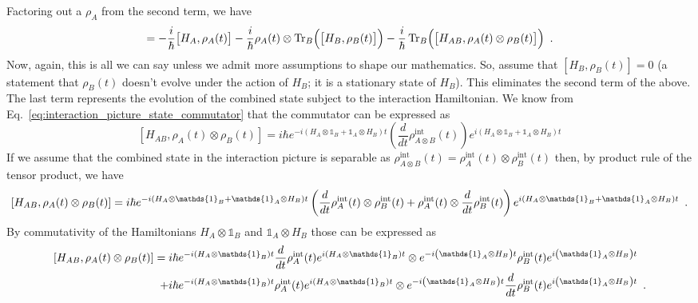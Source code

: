 \documentclass{article}
\begin{document}
Factoring out a $ \rho_{A} $ from the second term, we have
\begin{equation}
= -\frac{i}{\hbar} \bigl[  H_{A} , \rho_{A}(t) \bigr]
-\frac{i}{\hbar} \rho_{A}(t) \otimes \operatorname{Tr}_{B} \Bigl( \bigl[ H_{B} , \rho_{B}(t)
      \label{eq:evolution_of_density_matrix_in_interaction_picture_intermediate_form}
\bigr] \Bigr)
- \frac{i}{\hbar} \operatorname{Tr}_{B} \Bigl( \bigl[ H_{AB} ,  \rho_{A}(t) \otimes \rho_{B}(t) \bigr] \Bigr) \enskip.
\end{equation}
Now, again, this is all we can say unless we admit more assumptions to shape our
mathematics. So, assume that $ \left[H_{B}, \rho_{B}(t)\right] = 0 $ (a
statement that $ \rho_{B}(t) $ doesn't evolve under the action of $ H_{B} $;
it is a stationary state of $ H_{B} $). This eliminates the second term of
the above. The last term represents the evolution of the combined state
subject to the interaction Hamiltonian. We know from
Eq.~\ref{eq:interaction_picture_state_commutator} that the commutator can be
expressed as
\begin{equation}
   \left[ H_{AB}, \rho_{A}(t) \otimes \rho_{B}(t) \right] = i \hbar e^{- i (H_{A} \otimes \mathds{1}_{B} + \mathds{1}_{A}
      \otimes H_{B}) t } \left(\frac{d}{dt} \rho^{\textrm{int}}_{A \otimes B}(t) \right) e^{i (H_{A} \otimes \mathds{1}_{B} + \mathds{1}_{A}
   \otimes H_{B}) t }
\end{equation}
If we assume that the combined state in the interaction picture is separable as
$ \rho_{A \otimes B}^{\textrm{int}}(t) =
\rho_{A}^{\textrm{int}}(t) \otimes \rho_{B}^{\textrm{int}}(t) $ then, by product
rule of the tensor product, we have
\begin{equation}
   \left[ H_{AB}, \rho_{A}(t) \otimes \rho_{B}(t) \right] = i \hbar e^{- i (H_{A} \otimes \mathds{1}_{B} + \mathds{1}_{A}
      \otimes H_{B}) t } \left(\frac{d}{dt} \rho^{\textrm{int}}_{A}(t) \otimes
      \rho_{B}^{\textrm{int}}(t) + \rho^{\textrm{int}}_{A}(t) \otimes \frac{d}{dt}
      \rho_{B}^{\textrm{int}}(t) \right) e^{i (H_{A} \otimes \mathds{1}_{B} + \mathds{1}_{A}
   \otimes H_{B}) t } \enskip.
\end{equation}
By commutativity of the Hamiltonians $ H_{A} \otimes \mathds{1}_{B} $ and $ \mathds{1}_{A}
   \otimes H_{B} $ those can be expressed as
\begin{align*}
   \left[ H_{AB}, \rho_{A}(t) \otimes \rho_{B}(t) \right] = i \hbar
   & e^{- i (H_{A} \otimes \mathds{1}_{B}) t }
   \frac{d}{dt} \rho^{\textrm{int}}_{A}(t)
   e^{i (H_{A} \otimes \mathds{1}_{B}) t }
   \otimes
   e^{-i \left( \mathds{1}_{A} \otimes H_{B} \right) t }
      \rho_{B}^{\textrm{int}}(t)
      e^{i \left( \mathds{1}_{A} \otimes H_{B} \right) t }
      \\
      + i \hbar & e^{- i (H_{A} \otimes \mathds{1}_{B}) t }
      \rho^{\textrm{int}}_{A}(t)
      e^{ i (H_{A} \otimes \mathds{1}_{B}) t }
      \otimes
      e^{-i \left( \mathds{1}_{A} \otimes H_{B} \right) t }
      \frac{d}{dt} \rho_{B}^{\textrm{int}}(t)
      e^{i \left( \mathds{1}_{A} \otimes H_{B} \right) t }
      \enskip.
\end{align*}
\end{document}
